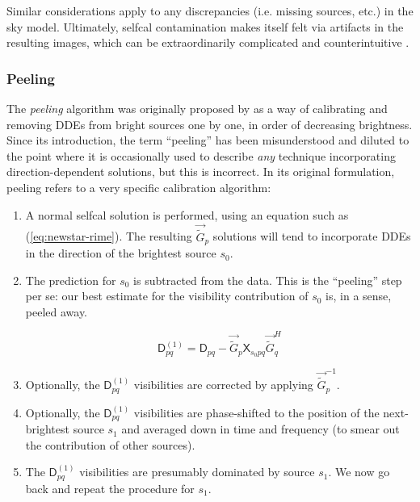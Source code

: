 \documentclass{aa}
\newcommand{\herm}{H}
\newcommand{\jones}[2]{\vec {#1}_{#2}}
\newcommand{\jonesinv}[2]{\vec {#1}^{-1}_{#2}}
\newcommand{\jonesT}[2]{\vec {#1}^{\herm}_{#2}}
\newcommand{\coh}[2]{\mathsf{{#1}}_{{#2}}}
\begin{document}
Similar considerations apply to any discrepancies (i.e. missing sources, etc.) in the sky model. Ultimately, selfcal contamination makes itself felt via artifacts in the resulting images, which can be extraordinarily complicated and counterintuitive \citep[for an example, see Fig.~17 of Paper III,][]{RRIME3}.

\subsubsection{Peeling\label{sec:peeling}}

The \emph{peeling} algorithm was originally proposed by \citet{JEN:peeling} as a way of calibrating and removing DDEs from bright sources one by one, in order of decreasing brightness. Since its introduction, the term ``peeling'' has been misunderstood and diluted to the point where it is occasionally used to describe {\em any} technique incorporating direction-dependent solutions, but this is incorrect. In its original formulation, peeling refers to a very specific calibration algorithm:

\begin{enumerate}

\item A normal selfcal solution is performed, using an equation such as (\ref{eq:newstar-rime}). The resulting $\jones{\tilde{G}}{p}$ solutions will tend to incorporate DDEs in the direction of the brightest source $s_0$.

\item The prediction for $s_0$ is subtracted from the data. This is the ``peeling'' step per se: our best estimate for the visibility contribution of $s_0$ is, in a sense, peeled away.

\[
\coh{D}{pq}^{(1)} = \coh{D}{pq} - \jones{\tilde{G}}{p} \coh{X}{s_0 pq} \jonesT{\tilde{G}}{q}
\]

\item Optionally, the $\coh{D}{pq}^{(1)}$ visibilities are corrected by applying $\jonesinv{\tilde{G}}{p}$.

\item Optionally, the $\coh{D}{pq}^{(1)}$ visibilities are phase-shifted to the position of the next-brightest source $s_1$ and averaged down in time and frequency (to smear out the contribution of other sources).
 
\item The $\coh{D}{pq}^{(1)}$ visibilities are presumably dominated by source $s_1$. We now go back and repeat the procedure for $s_1$.

\end{enumerate}
\end{document}
